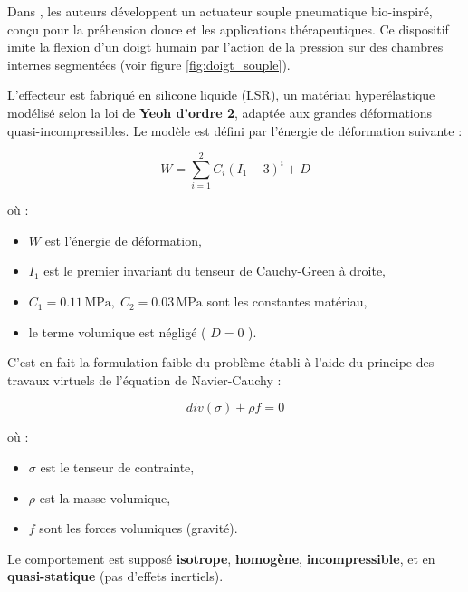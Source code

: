 \documentclass[a4paper, 11pt]{report}
\begin{document}
            Dans \cite{bhat_numerical_2025}, les auteurs développent un actuateur souple pneumatique bio-inspiré, conçu pour la préhension douce et les applications thérapeutiques. Ce dispositif imite la flexion d’un doigt humain par l'action de la pression sur des chambres internes segmentées (voir figure \ref{fig:doigt_souple}).

            L'effecteur est fabriqué en silicone liquide (LSR), un matériau hyperélastique modélisé selon la loi de \textbf{Yeoh d'ordre 2}, adaptée aux grandes déformations quasi-incompressibles. Le modèle est défini par l'énergie de déformation suivante :

            \[
            W = \sum_{i=1}^{2} C_i (I_1 - 3)^i + D
            \]

            où :
            \begin{itemize}
            \item \( W \) est l'énergie de déformation,
            \item \( I_1 \) est le premier invariant du tenseur de Cauchy-Green à droite,
            \item \( C_1 = 0.11\,\text{MPa},\; C_2 = 0.03\,\text{MPa} \) sont les constantes matériau,
            \item le terme volumique est négligé ( \( D = 0 \) ).
            \end{itemize}

            C'est en fait la formulation faible du problème établi à l'aide du principe des travaux virtuels de l'équation de Navier-Cauchy :

            \[
            div(\sigma) + \rho f = 0
            \]

            où :
            \begin{itemize}
            \item \( \sigma \) est le tenseur de contrainte,
            \item \( \rho \) est la masse volumique,
            \item \( f \) sont les forces volumiques (gravité).
            \end{itemize}

            Le comportement est supposé \textbf{isotrope}, \textbf{homogène}, \textbf{incompressible}, et en \textbf{quasi-statique} (pas d’effets inertiels).
\end{document}
